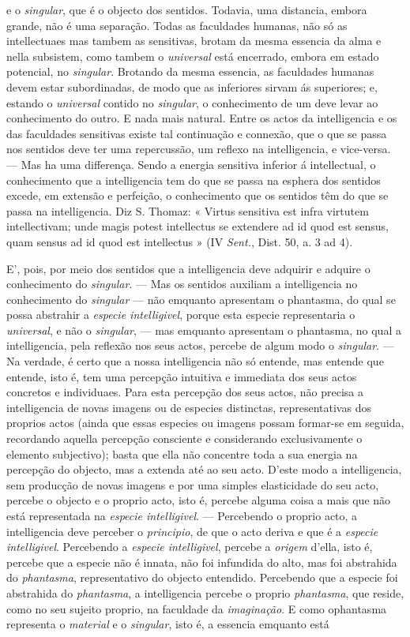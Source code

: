 e o \emph{singular}, que é o objecto dos sentidos. Todavia, uma distancia, embora grande, não é uma separação. Todas as faculdades humanas, não só as intellectuaes mas tambem as sensitivas, brotam da mesma essencia da alma e nella subsistem, como tambem o \emph{universal} está encerrado, embora em estado potencial, no \emph{singular}. Brotando da mesma essencia, as faculdades humanas devem estar subordinadas, de modo que as inferiores sirvam ás superiores; e, estando o \emph{universal} contido no \emph{singular}, o conhecimento de um deve levar ao conhecimento do outro. E nada mais natural. Entre os actos da intelligencia e os das faculdades sensitivas existe tal continuação e connexão, que o que se passa nos sentidos deve ter uma repercussão, um reflexo na intelligencia, e vice-versa. --- Mas ha uma differença. Sendo a energia sensitiva inferior á intellectual, o conhecimento que a intelligencia tem do que se passa na esphera dos sentidos excede, em extensão e perfeição, o conhecimento que os sentidos têm do que se passa na intelligencia. Diz S. Thomaz: « Virtus sensitiva est infra virtutem intellectivam; unde magis potest intellectus se extendere ad id quod est sensus, quam sensus ad id quod est intellectus » (IV \emph{Sent.}, Dist. 50, a. 3 ad 4).\par E', pois, por meio dos sentidos que a intelligencia deve adquirir e adquire o conhecimento do \emph{singular}. --- Mas os sentidos auxiliam a intelligencia no conhecimento do \emph{singular} --- não emquanto apresentam o phantasma, do qual se possa abstrahir a \emph{especie intelligivel}, porque esta especie representaria o \emph{universal}, e não o \emph{singular}, --- mas emquanto apresentam o phantasma, no qual a intelligencia, pela reflexão nos seus actos, percebe de algum modo o \emph{singular}. --- Na verdade, é certo que a nossa intelligencia não só entende, mas entende que entende, isto é, tem uma percepção intuitiva e immediata dos seus actos concretos e individuaes. Para esta percepção dos seus actos, não precisa a intelligencia de novas imagens ou de especies distinctas, representativas dos proprios actos (ainda que essas especies ou imagens possam formar-se em seguida, recordando aquella percepção consciente e considerando exclusivamente o elemento subjectivo); basta que ella não concentre toda a sua energia na percepção do objecto, mas a extenda até ao seu acto. D'este modo a intelligencia, sem producção de novas imagens e por uma simples elasticidade do seu acto, percebe o objecto e o proprio acto, isto é, percebe alguma coisa a mais que não está representada na \emph{especie intelligivel}. --- Percebendo o proprio acto, a intelligencia deve perceber o \emph{principio}, de que o acto deriva e que é a \emph{especie intelligivel}. Percebendo a \emph{especie intelligivel}, percebe a \emph{origem} d'ella, isto é, percebe que a especie não é innata, não foi infundida do alto, mas foi abstrahida do \emph{phantasma}, representativo do objecto entendido. Percebendo que a especie foi abstrahida do \emph{phantasma}, a intelligencia percebe o proprio \emph{phantasma}, que reside, como no seu sujeito proprio, na faculdade da \emph{imaginação}. E como ophantasma representa o \emph{material} e o \emph{singular}, isto é, a essencia emquanto está 